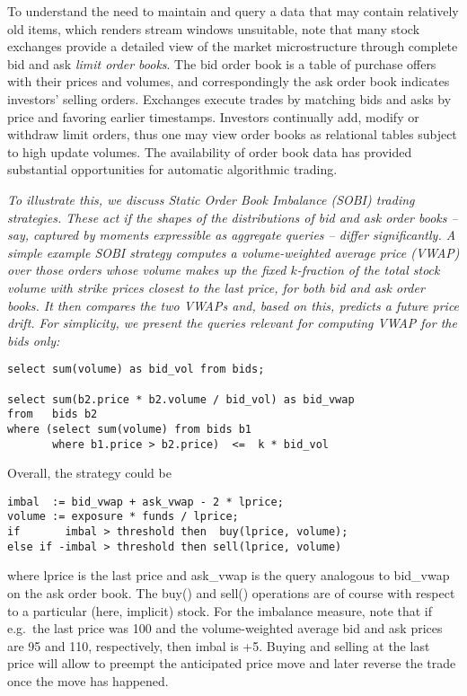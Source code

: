 To understand the need to maintain and query a data that may contain relatively old items, which renders stream windows unsuitable, note that
many stock exchanges provide a detailed view of the market microstructure
through complete bid and ask {\em limit order books}. The bid order book is a
table of purchase offers with their prices and volumes, and correspondingly the
ask order book indicates investors' selling orders. Exchanges execute trades by
matching bids and asks by price and favoring earlier timestamps. Investors
continually add, modify or withdraw limit orders, thus one may view order books
as relational tables subject to high update volumes. The availability of order
book data has provided substantial opportunities for automatic algorithmic
trading.



\begin{example}\em
To illustrate this, we discuss Static Order Book Imbalance (SOBI) trading
strategies. These act if the shapes of the distributions of bid and ask
order books -- say, captured by moments expressible as aggregate queries --
differ significantly. A simple example SOBI strategy \cite{sobi-kearns}
computes a volume-weighted average price (VWAP) over those
orders whose volume makes up the fixed $k$-fraction of the total stock volume
with strike prices closest to the last price, for both
bid and ask order books. It then compares the two VWAPs and, based on
this, predicts a future price drift.
For simplicity, we present the queries relevant for computing
VWAP for the bids only:
\begin{verbatim}
select sum(volume) as bid_vol from bids;

select sum(b2.price * b2.volume / bid_vol) as bid_vwap
from   bids b2
where (select sum(volume) from bids b1
       where b1.price > b2.price)  <=  k * bid_vol
\end{verbatim}
Overall, the strategy could be
\begin{verbatim}
imbal  := bid_vwap + ask_vwap - 2 * lprice;
volume := exposure * funds / lprice;
if       imbal > threshold then  buy(lprice, volume);
else if -imbal > threshold then sell(lprice, volume)
\end{verbatim}
where lprice is the last price and
ask\_vwap is the query analogous to bid\_vwap
on the ask order book. The buy() and sell() operations are of course
with respect to a particular (here, implicit) stock.
For the imbalance measure, note that if e.g.\ the last price was 100 and
the volume-weighted average bid and ask prices are 95 and 110, respectively,
then imbal is +5.
Buying and selling at the last price will allow to preempt the
anticipated price move and later reverse the trade once the
move has happened.


\end{example}
